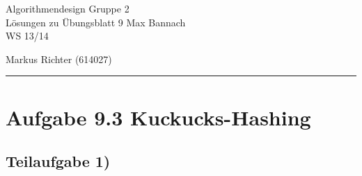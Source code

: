 \documentclass[a4paper, fontsize=10pt]{scrartcl}
\begin{document}
 

{\huge{Algorithmendesign} \hfill \large{ Gruppe 2}}\\  
{\large Lösungen zu Übungsblatt 9} \hfill Max Bannach\\
{\large WS 13/14}
\begin{flushright}Markus Richter (614027)\end{flushright}
\rule{\textwidth}{.3mm}

\section*{Aufgabe 9.3 Kuckucks-Hashing}
\subsection*{Teilaufgabe 1)}
\end{document}
